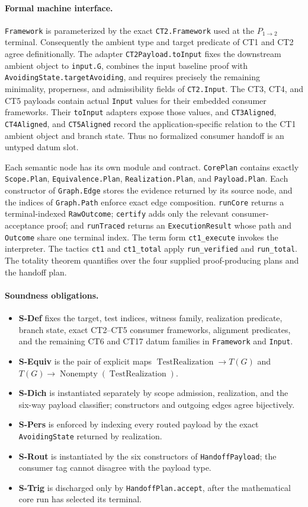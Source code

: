 \documentclass[
  11pt,
]{article}
\providecommand{\tightlist}{%
  \setlength{\itemsep}{0pt}\setlength{\parskip}{0pt}}
\theoremstyle{definition}
\newcommand{\ctpar}[1]{\paragraph{#1.}}
\begin{document}
\ctpar{Formal machine interface}
\texttt{Framework} is parameterized by the exact \texttt{CT2.Framework}
used at the \(P_{1\to2}\) terminal.  Consequently the ambient type and
target predicate of CT1 and CT2 agree definitionally.  The adapter
\texttt{CT2Payload.toInput} fixes the downstream ambient object to
\texttt{input.G}, combines the input baseline proof with
\texttt{AvoidingState.targetAvoiding}, and requires precisely the remaining
minimality, properness, and admissibility fields of \texttt{CT2.Input}.
The CT3, CT4, and CT5 payloads contain actual \texttt{Input} values for
their embedded consumer frameworks.  Their \texttt{toInput} adapters expose
those values, and \texttt{CT3Aligned}, \texttt{CT4Aligned}, and
\texttt{CT5Aligned} record the application-specific relation to the CT1
ambient object and branch state.  Thus no formalized consumer handoff is an
untyped datum slot.

Each semantic node has its own module and contract.  \texttt{CorePlan}
contains exactly \texttt{Scope.Plan}, \texttt{Equivalence.Plan},
\texttt{Realization.Plan}, and \texttt{Payload.Plan}.  Each constructor of
\texttt{Graph.Edge} stores the evidence returned by its source node, and
the indices of \texttt{Graph.Path} enforce exact edge composition.
\texttt{runCore} returns a terminal-indexed \texttt{RawOutcome};
\texttt{certify} adds only the relevant consumer-acceptance proof; and
\texttt{runTraced} returns an \texttt{ExecutionResult} whose path and
\texttt{Outcome} share one terminal index.  The term form
\texttt{ct1\_execute} invokes the interpreter.  The tactics \texttt{ct1}
and \texttt{ct1\_total} apply \texttt{run\_verified} and
\texttt{run\_total}.  The totality theorem quantifies over the four supplied
proof-producing plans and the handoff plan.

\ctpar{Soundness obligations}
\begin{itemize}
\tightlist
\item \textbf{S-Def} fixes the target, test indices, witness family, realization predicate, branch state, exact CT2--CT5 consumer frameworks, alignment predicates, and the remaining CT6 and CT17 datum families in \texttt{Framework} and \texttt{Input}.
\item \textbf{S-Equiv} is the pair of explicit maps \(\operatorname{TestRealization}\to T(G)\) and \(T(G)\to\operatorname{Nonempty}(\operatorname{TestRealization})\).
\item \textbf{S-Dich} is instantiated separately by scope admission, realization, and the six-way payload classifier; constructors and outgoing edges agree bijectively.
\item \textbf{S-Pers} is enforced by indexing every routed payload by the exact \texttt{AvoidingState} returned by realization.
\item \textbf{S-Rout} is instantiated by the six constructors of \texttt{HandoffPayload}; the consumer tag cannot disagree with the payload type.
\item \textbf{S-Trig} is discharged only by \texttt{HandoffPlan.accept}, after the mathematical core run has selected its terminal.
\end{itemize}
\end{document}

